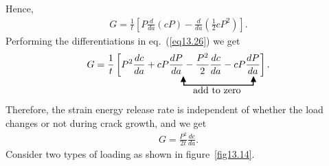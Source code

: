 \documentclass{AeroStructure-ERJohnson}
\begin{document}
\vspace*{-12pt}

Hence,
\begin{align}\label{eq13.26}
G=\frac{1}{t}\left[P \frac{d}{d a}(c P)-\frac{d}{d a}\left(\frac{1}{2} c P^{2}\right)\right].
\end{align}
Performing the differentiations in eq.~(\ref{eq13.26}) we get
\begin{align}\label{eq13.27}
G=\frac{1}{t}\left[P^{2} \frac{d c}{d a}+c P \frac{d P}{d a}-\frac{P^{2}}{2} \frac{d c}{d a}-c P \frac{d P}{d a}\right].\\[-4pt]
\raisebox{4pt}{$\blacktriangle$}\hspace*{-3.6pt}\rule{1pt}{5pt}\hspace*{-0.5pt}\rule{6pc}{1pt}\hspace*{-0.5pt}\rule{1pt}{5pt}\hspace*{-3.8pt}\raisebox{4pt}{$\blacktriangle$}\hspace*{1.1pc}\nonumber\\[-7pt]
\mbox{add to zero}\hspace*{2.5pc}\nonumber
\end{align}
Therefore, the strain energy release rate is independent of whether the load changes or not during crack growth, and we get
\begin{align}\label{eq13.28}
G=\frac{P^{2}}{2 t} \frac{d c}{d a}.
\end{align}
Consider two types of loading as shown in figure~\ref{fig13.14}.
\end{document}
